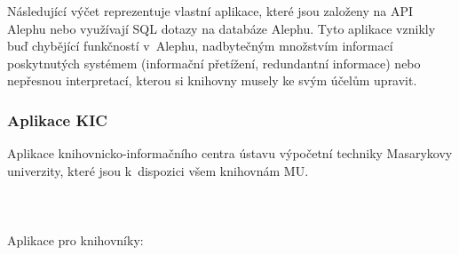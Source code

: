 \documentclass[
	11pt, oneside, printed, final, palatino
	microtype,
	table,   %
	lof,     %
	lot     %
]{fithesis3}
\begin{document}
{Následující výčet reprezentuje vlastní aplikace, které jsou založeny na API Alephu nebo využívají SQL dotazy na databáze Alephu. Tyto aplikace vznikly buď chybějící funkčností v~Alephu, nadbytečným množstvím informací poskytnutých systémem (informační přetížení, redundantní informace) nebo nepřesnou interpretací, kterou si knihovny musely ke svým účelům upravit.

\subsubsection{{\large Aplikace KIC}}
Aplikace knihovnicko-informačního centra ústavu výpočetní techniky Masarykovy univerzity, které jsou k~dispozici všem knihovnám MU.
~\\~\\~\\~\\%
Aplikace pro knihovníky:

}
\end{document}
